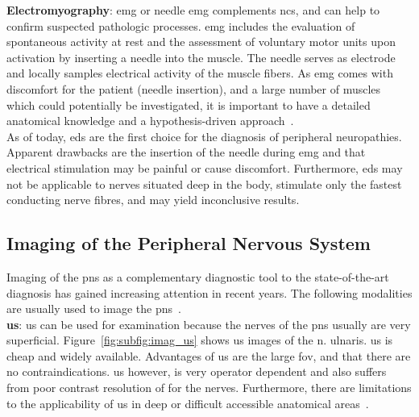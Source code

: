 \textbf{Electromyography}: \gls{emg} or needle \gls{emg} complements \gls{ncs}, and can help to confirm suspected pathologic processes. \gls{emg} includes the evaluation of spontaneous activity at rest and the assessment of voluntary motor units upon activation by inserting a needle into the muscle. The needle serves as electrode and locally samples electrical activity of the muscle fibers. As \gls{emg} comes with discomfort for the patient (needle insertion), and a large number of muscles which could potentially be investigated, it is important to have a detailed anatomical knowledge and a hypothesis-driven approach~\cite{Mohassel2015}.\\
As of today, \gls{eds} are the first choice for the diagnosis of peripheral neuropathies. Apparent drawbacks are the insertion of the needle during \gls{emg} and that electrical stimulation may be painful or cause discomfort. Furthermore, \gls{eds} may not be applicable to nerves situated deep in the body, stimulate only the fastest conducting nerve fibres, and may yield inconclusive results.

\subsection{Imaging of the Peripheral Nervous System}
Imaging of the \gls{pns} as a complementary diagnostic tool to the state-of-the-art diagnosis has gained increasing attention in recent years. The following modalities are usually used to image the \gls{pns}~\cite{Ohana2014CurrentSystem}.\\

\textbf{\gls{us}}: \gls{us} can be used for examination because the nerves of the \gls{pns} usually are very superficial. Figure~\ref{fig:subfig:imag_us} shows \gls{us} images of the \gls{n.} ulnaris. \gls{us} is cheap and widely available. Advantages of \gls{us} are the large \gls{fov}, and that there are no contraindications. \gls{us} however, is very operator dependent and also suffers from poor contrast resolution of for the nerves. Furthermore, there are limitations to the applicability of \gls{us} in deep or difficult accessible anatomical areas~\cite{Ohana2014CurrentSystem}.\\

